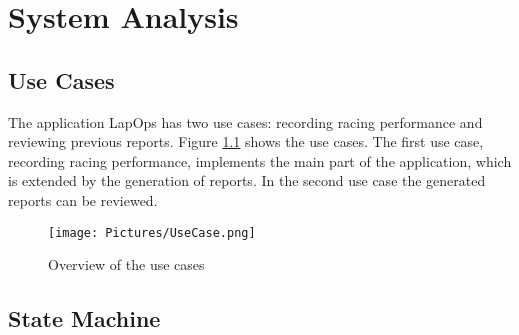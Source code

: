 \chapter{System Analysis}

\section{Use Cases}
The application LapOps has two use cases: recording racing performance and reviewing previous reports. Figure \ref{fig:usecase} shows the use cases. The first use case, recording racing performance, implements the main part of the application, which is extended by the generation of reports. In the second use case the generated reports can be reviewed. 

\begin{figure}[H]
	\centering
	\texttt{[image: Pictures/UseCase.png]}
	\caption{Overview of the use cases}
	\label{fig:usecase}
\end{figure}

\section{State Machine}
